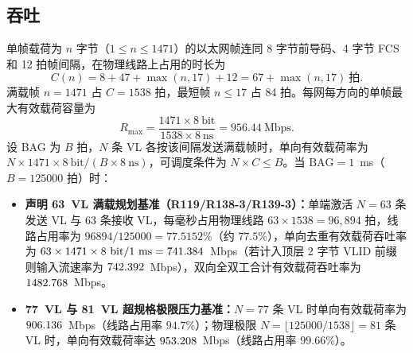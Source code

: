 \subsection{吞吐}

单帧载荷为 $n$ 字节（$1\le n\le 1471$）的以太网帧连同 8 字节前导码、4 字节 FCS 和 12 拍帧间隔，在物理线路上占用的时长为
\begin{equation}
C(n) = 8 + 47 + \max(n,17) + 12 = 67 + \max(n,17)\ \text{拍}.
\end{equation}
满载帧 $n=1471$ 占 $C=1538$ 拍，最短帧 $n\le 17$ 占 84 拍。每网每方向的单帧最大有效载荷容量为
\begin{equation}
R_\text{max} = \frac{1471 \times 8~\text{bit}}{1538 \times 8~\text{ns}} = 956.44~\text{Mbps}.
\end{equation}
设 BAG 为 $B$ 拍，$N$ 条 VL 各按该间隔发送满载帧时，单向有效载荷率为 $N \times 1471 \times 8~\text{bit}/(B \times 8~\text{ns})$，可调度条件为 $N \times C \le B$。当 $\text{BAG}=1$~ms（$B=125000$ 拍）时：
\begin{itemize}[leftmargin=2em,itemsep=1pt]
  \item \textbf{声明 63~VL 满载规划基准（R119/R138-3/R139-3）：}单端激活 $N=63$ 条发送 VL 与 $63$ 条接收 VL，每毫秒占用物理线路 $63\times 1538 = 96,894$ 拍，线路占用率为 $96894/125000 = 77.5152\%$（约 $77.5\%$），单向去重有效载荷吞吐率为 $63\times 1471\times 8~\text{bit}/1~\text{ms} = 741.384$~Mbps（若计入顶层 2 字节 VLID 前缀则输入流速率为 $742.392$~Mbps），双向全双工合计有效载荷吞吐率为 $1482.768$~Mbps。
  \item \textbf{77~VL 与 81~VL 超规格极限压力基准：}$N=77$ 条 VL 时单向有效载荷率为 $906.136$~Mbps（线路占用率 $94.7\%$）；物理极限 $N = \lfloor 125000/1538 \rfloor = 81$ 条 VL 时，单向有效载荷率达 $953.208$~Mbps（线路占用率 $99.66\%$）。
\end{itemize}


